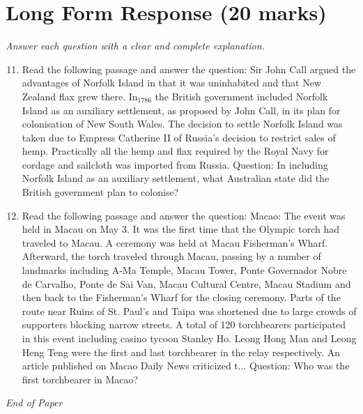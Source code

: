 \documentclass[12pt]{article}
\begin{document}
\section*{Long Form Response (20 marks)}
\textit{Answer each question with a clear and complete explanation.}
\begin{enumerate}[label=\arabic*.]
\setcounter{enumi}{10}
\item Read the following passage and answer the question: Sir John Call argued the advantages of Norfolk Island in that it was uninhabited and that New Zealand flax grew there. In$_{1786}$ the British government included Norfolk Island as an auxiliary settlement, as proposed by John Call, in its plan for colonisation of New South Wales. The decision to settle Norfolk Island was taken due to Empress Catherine II of Russia's decision to restrict sales of hemp. Practically all the hemp and flax required by the Royal Navy for cordage and sailcloth was imported from Russia. Question: In including Norfolk Island as an auxiliary settlement, what Australian state did the British government plan to colonise?
\item Read the following passage and answer the question: Macao: The event was held in Macau on May 3. It was the first time that the Olympic torch had traveled to Macau. A ceremony was held at Macau Fisherman's Wharf. Afterward, the torch traveled through Macau, passing by a number of landmarks including A-Ma Temple, Macau Tower, Ponte Governador Nobre de Carvalho, Ponte de Sai Van, Macau Cultural Centre, Macau Stadium and then back to the Fisherman's Wharf for the closing ceremony. Parts of the route near Ruins of St. Paul's and Taipa was shortened due to large crowds of supporters blocking narrow streets. A total of 120 torchbearers participated in this event including casino tycoon Stanley Ho. Leong Hong Man and Leong Heng Teng were the first and last torchbearer in the relay respectively. An article published on Macao Daily News criticized t... Question: Who was the first torchbearer in Macao?
\end{enumerate}

\vfill
\noindent\textit{End of Paper}
\end{document}
